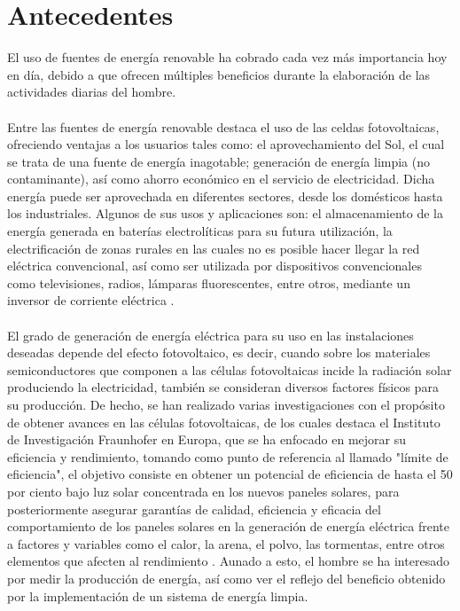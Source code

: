 
\section{Antecedentes} %
El uso de fuentes de energía renovable ha cobrado cada vez más importancia hoy en día, debido a que ofrecen múltiples beneficios durante la elaboración de las actividades diarias del hombre. 
\paragraph{}
Entre las fuentes de energía renovable destaca el uso de las celdas fotovoltaicas, ofreciendo ventajas a los usuarios tales como: el aprovechamiento del Sol, el cual se trata de una fuente de energía inagotable; generación de energía limpia (no contaminante), así como ahorro económico en el servicio de electricidad. Dicha energía puede ser aprovechada en diferentes sectores, desde los domésticos hasta los industriales. Algunos de sus usos y aplicaciones son: el almacenamiento de la energía generada en baterías electrolíticas para su futura utilización, la electrificación de zonas rurales en las cuales no es posible hacer llegar la red eléctrica convencional, así como ser utilizada por dispositivos convencionales como televisiones, radios, lámparas fluorescentes, entre otros, mediante un inversor de corriente eléctrica \citep{Pre1}.   
\paragraph{}
El grado de generación de energía eléctrica para su uso en las instalaciones deseadas depende del efecto fotovoltaico, es decir, cuando sobre los materiales semiconductores que componen a las células fotovoltaicas incide la radiación solar produciendo la electricidad, también se consideran diversos factores físicos para su producción. De hecho, se han realizado varias investigaciones con el propósito de obtener avances en las células fotovoltaicas, de los cuales destaca el Instituto de Investigación Fraunhofer en Europa, que se ha enfocado en mejorar su eficiencia y rendimiento, tomando como punto de referencia al llamado "límite de eficiencia", el objetivo consiste en obtener un potencial de eficiencia de hasta el 50 por ciento bajo luz solar concentrada en los nuevos paneles solares, para posteriormente asegurar garantías de calidad, eficiencia y eficacia del comportamiento de los paneles solares en la generación de energía eléctrica frente a factores y variables como el calor, la arena, el polvo, las tormentas, entre otros elementos que afecten al rendimiento \citep{Pre1}. Aunado a esto, el hombre se ha interesado por medir la producción de energía, así como ver el reflejo del beneficio obtenido por la implementación de un sistema de energía limpia. 

